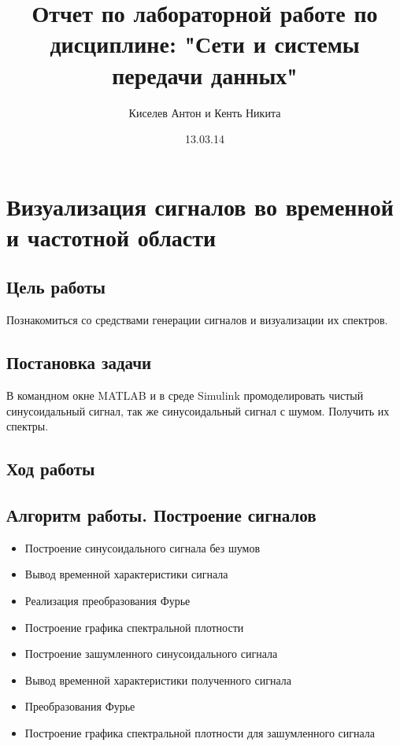 \documentclass[10pt,a4paper]{report}
\author{Киселев Антон и Кенть Никита}
\title{Отчет по лабораторной работе по дисциплине: "Сети и системы передачи данных"\newline
}
\date{13.03.14}
\begin{document}
\maketitle
\pagebreak
\chapter {Визуализация сигналов во временной и частотной области}
\section{Цель работы}
Познакомиться со средствами генерации сигналов и визуализации их спектров.
\section{Постановка задачи}
В командном окне MATLAB и в среде Simulink промоделировать чистый синусоидальный сигнал, 
так же синусоидальный сигнал с шумом. Получить их спектры.

\section{Ход работы}
\section{Алгоритм работы. Построение сигналов}
\begin{itemize}
\item Построение синусоидального сигнала без шумов
\item Вывод временной характеристики сигнала
\item Реализация  преобразования Фурье 
\item Построение графика спектральной плотности 
\item Построение зашумленного синусоидального сигнала  
\item Вывод временной характеристики полученного сигнала
\item Преобразования Фурье 
\item Построение графика спектральной плотности для зашумленного сигнала
\end{itemize}
\end{document}
